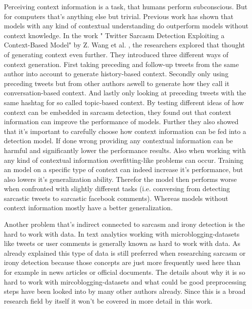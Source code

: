 \documentclass[sigconf,  review=false, nonacm=true]{acmart}
\begin{document}
Perceiving context information is a task, that humans perform subconscious. But for computers that's anything else but trivial. Previous work \cite{The-Role-of-Conversation-Context-for-Sarcasm-Detection-in-Online-Interactions} has shown that models with any kind of contextual understanding do outperform models without context knowledge. In the work " Twitter Sarcasm Detection Exploiting a Context-Based Model" by Z. Wang et al. \cite{Twitter-Sarcasm-Detection-Exploiting-a-Context-Based-Model}, the researchers explored that thought of generating context even further. They introduced three different ways of context generation. First taking preceding and follow-up tweets from the same author into account to generate history-based context. Secondly only using preceding tweets but from other authors aswell to generate how they call it conversation-based context. And lastly only looking at preceding tweets with the same hashtag for so called topic-based context.
By testing different ideas of how context can be embedded in sarcasm detection, they found out that context information can improve the performance of models. Further they also showed that it's important to carefully choose how context information can be fed into a detection model. If done wrong providing any contextual information can be harmful and significantly lower the performance results.
Also when working with any kind of contextual information overfitting-like problems can occur. Training an model on a specific type of context can indeed increase it's performance, but also lowers it's generalization ability. Therefor the model then performs worse when confronted with slightly different tasks (i.e. conversing from detecting sarcastic tweets to sarcastic facebook comments). Whereas models without context information mostly have a better generalization.

Another problem that's indirect connected to sarcasm and irony detection is the hard to work with data. In text analytics working with microblogging-datasets like tweets or user comments is generally known as hard to work with data. As already explained this type of data is still preferred when researching sarcasm or irony detection because those concepts are just more frequently used here than for example in news articles or official documents. The details about why it is so hard to work with mircoblogging-datasets and what could be good preprocessing steps have been looked into by many other authors \cite{The-effect-of-preprocessing-techniques-on-Twitter-sentiment-analysis} \cite{Analysis-of-Twitter-Specific-Preprocessing-Technique-for-Tweets} \cite{Effective-Text-Data-Preprocessing-Technique-for-Sentiment-Analysis-in-Social-Media-Data} \cite{Efficient-Algorithms-for-Preprocessing-and-Stemming-of-Tweets-in-a-Sentiment-Analysis-System} already. Since this is a broad research field by itself it won't be covered in more detail in this work.
\end{document}
